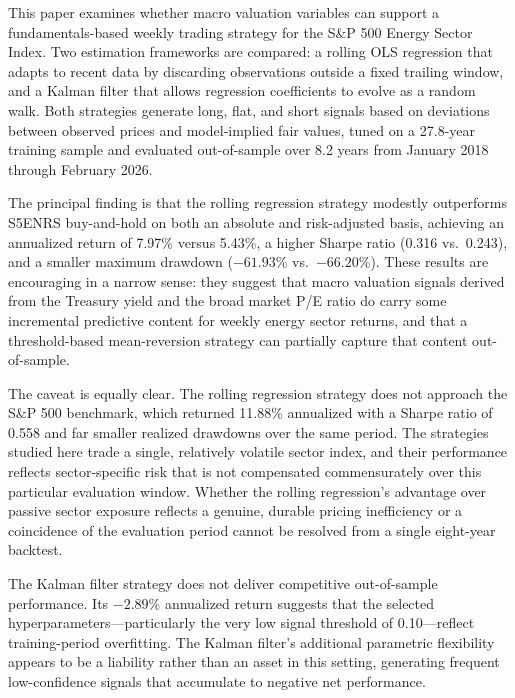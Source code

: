 \documentclass[12pt]{article}
\begin{document}
This paper examines whether macro valuation variables can support a fundamentals-based weekly trading strategy for the S\&P 500 Energy Sector Index. Two estimation frameworks are compared: a rolling OLS regression that adapts to recent data by discarding observations outside a fixed trailing window, and a Kalman filter that allows regression coefficients to evolve as a random walk. Both strategies generate long, flat, and short signals based on deviations between observed prices and model-implied fair values, tuned on a 27.8-year training sample and evaluated out-of-sample over 8.2 years from January 2018 through February 2026.

The principal finding is that the rolling regression strategy modestly outperforms S5ENRS buy-and-hold on both an absolute and risk-adjusted basis, achieving an annualized return of 7.97\% versus 5.43\%, a higher Sharpe ratio (0.316 vs.\ 0.243), and a smaller maximum drawdown ($-61.93\%$ vs.\ $-66.20\%$). These results are encouraging in a narrow sense: they suggest that macro valuation signals derived from the Treasury yield and the broad market P/E ratio do carry some incremental predictive content for weekly energy sector returns, and that a threshold-based mean-reversion strategy can partially capture that content out-of-sample.

The caveat is equally clear. The rolling regression strategy does not approach the S\&P 500 benchmark, which returned 11.88\% annualized with a Sharpe ratio of 0.558 and far smaller realized drawdowns over the same period. The strategies studied here trade a single, relatively volatile sector index, and their performance reflects sector-specific risk that is not compensated commensurately over this particular evaluation window. Whether the rolling regression's advantage over passive sector exposure reflects a genuine, durable pricing inefficiency or a coincidence of the evaluation period cannot be resolved from a single eight-year backtest.

The Kalman filter strategy does not deliver competitive out-of-sample performance. Its $-2.89\%$ annualized return suggests that the selected hyperparameters—particularly the very low signal threshold of 0.10—reflect training-period overfitting. The Kalman filter's additional parametric flexibility appears to be a liability rather than an asset in this setting, generating frequent low-confidence signals that accumulate to negative net performance.
\end{document}
